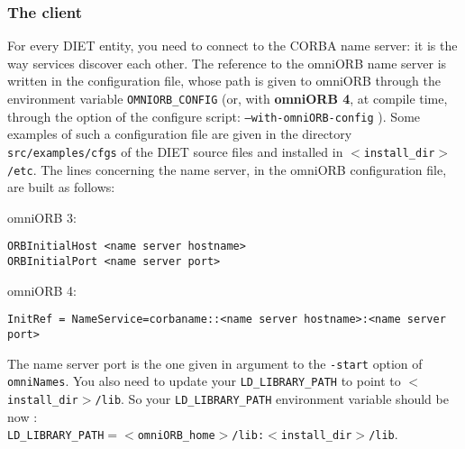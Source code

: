 \subsubsection{The client}

For every DIET entity, you need to connect to the CORBA name server: it is
the way services discover each other. The reference to the omniORB
name server is written in the configuration file, whose path is given
to omniORB through the environment variable \texttt{OMNIORB\_CONFIG}
(or, with \textbf{omniORB 4}, at compile time, through the option of
the configure script: \texttt{--with-omniORB-config} ). Some examples
of such a configuration file are given in the directory
\texttt{src/examples/cfgs} of the DIET source files and installed in
\texttt{$<$install\_dir$>$/etc}. The lines concerning the name server,
in the omniORB configuration file, are built as follows:
\begin{description}
 \item{omniORB 3:}
{\footnotesize
\begin{verbatim}
ORBInitialHost <name server hostname>
ORBInitialPort <name server port>
\end{verbatim}
}
 \item{omniORB 4:}
{\footnotesize
\begin{verbatim}
InitRef = NameService=corbaname::<name server hostname>:<name server port>
\end{verbatim}
}
The name server port is the one given in argument to the \texttt{-start} option
of \texttt{omniNames}.
You also need to update your \texttt{LD\_LIBRARY\_PATH} to point to \texttt{$<$install\_dir$>$/lib}.
So your \texttt{LD\_LIBRARY\_PATH} environment variable should be now :\\
\texttt{LD\_LIBRARY\_PATH$= <$omniORB\_home$>$/lib:$<$install\_dir$>$/lib}.

\end{description}



